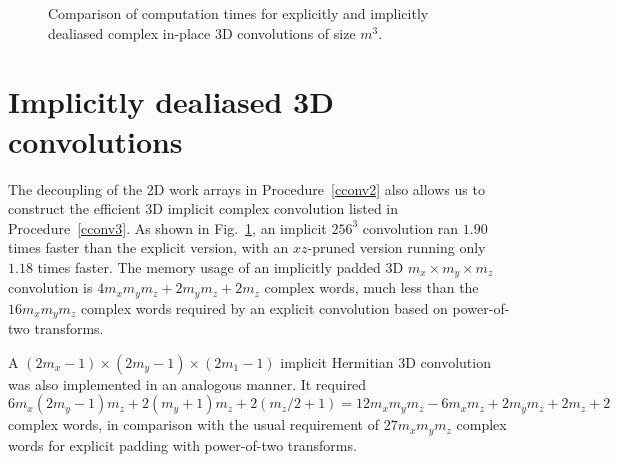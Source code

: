 \documentclass[final]{siamltex}
\begin{document}
\begin{figure}[htbp]
\begin{minipage}{0.48\linewidth}
\begin{center}
\caption{Comparison of computation times for explicitly and implicitly
dealiased complex in-place 3D convolutions of size $m^3$.}
\label{timing3c}
\end{center}
\end{minipage}
%
\end{figure}

\section{Implicitly dealiased 3D convolutions}\label{3d}

The decoupling of the 2D work arrays in Procedure~\ref{cconv2}
also allows us to construct the efficient 3D implicit complex convolution
listed in Procedure~\ref{cconv3}. As shown in Fig.~\ref{timing3c}, an implicit
$256^3$ convolution ran $1.90$ times faster than the explicit version, with
an $xz$-pruned version running only $1.18$ times faster. The memory usage of an
implicitly padded 3D $m_x\times m_y\times m_z$ convolution is
$4m_xm_ym_z+2m_y m_z+2m_z$ complex words, much less than the
$16m_xm_ym_z$ complex words required by an explicit 
convolution based on power-of-two transforms.

A $(2m_x-1)\times (2m_y-1)\times (2m_1-1)$ implicit Hermitian 3D
convolution was also implemented in an analogous manner. It required
$$
6m_x(2m_y-1)m_z+2(m_y+1)m_z+2(m_z/2+1)=12m_xm_ym_z-6m_xm_z+2m_ym_z+2m_z+2
$$
complex words, in comparison with the usual requirement of $27m_xm_ym_z$
complex words for explicit padding with power-of-two transforms.

\begin{function}[htbp]
  \Return \xf\;
\caption{cconv3(matrix~{\sf f}, matrix~{\sf g}) 
returns an in-place implicitly dealiased convolution of
$m_x\times m_y\times m_z$ matrices {\sf f} and {\sf g} using temporary
$m_x\times m_y\times m_z$ matrices ${\sf U}$ and ${\sf V}$, 
$m_y\times m_z$ matrices ${\sf u}_2$ and ${\sf v}_2$,
and vectors ${\sf u}_1$ and ${\sf v}_1$ of length~$m_z$.}\label{cconv3}
\end{function}
\end{document}
